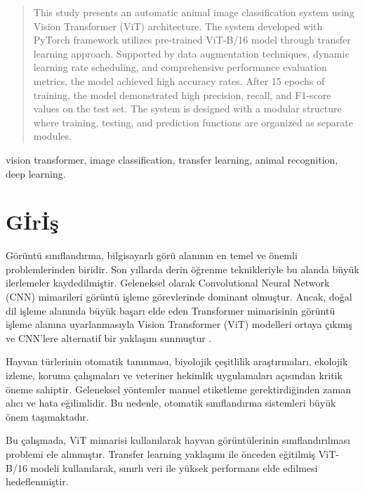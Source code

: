 \documentclass[conference, a4paper]{IEEEtran}
\begin{document}
	\begin{abstract}
		This study presents an automatic animal image classification system using Vision Transformer (ViT) architecture. The system developed with PyTorch framework utilizes pre-trained ViT-B/16 model through transfer learning approach. Supported by data augmentation techniques, dynamic learning rate scheduling, and comprehensive performance evaluation metrics, the model achieved high accuracy rates. After 15 epochs of training, the model demonstrated high precision, recall, and F1-score values on the test set. The system is designed with a modular structure where training, testing, and prediction functions are organized as separate modules.
	\end{abstract}
	\begin{IEEEkeywords}
		vision transformer, image classification, transfer learning, animal recognition, deep learning.
	\end{IEEEkeywords}
	
	\IEEEpeerreviewmaketitle
	
	\IEEEpubidadjcol
	
	
	\section{G{\footnotesize İ}r{\footnotesize İ}ş}
	
	Görüntü sınıflandırma, bilgisayarlı görü alanının en temel ve önemli problemlerinden biridir. Son yıllarda derin öğrenme teknikleriyle bu alanda büyük ilerlemeler kaydedilmiştir. Geleneksel olarak Convolutional Neural Network ({CNN}) mimarileri görüntü işleme görevlerinde dominant olmuştur. Ancak, doğal dil işleme alanında büyük başarı elde eden Transformer mimarisinin görüntü işleme alanına uyarlanmasıyla Vision Transformer ({ViT}) modelleri ortaya çıkmış ve CNN'lere alternatif bir yaklaşım sunmuştur .
	
	Hayvan türlerinin otomatik tanınması, biyolojik çeşitlilik araştırmaları, ekolojik izleme, koruma çalışmaları ve veteriner hekimlik uygulamaları açısından kritik öneme sahiptir. Geleneksel yöntemler manuel etiketleme gerektirdiğinden zaman alıcı ve hata eğilimlidir. Bu nedenle, otomatik sınıflandırma sistemleri büyük önem taşımaktadır.
	
	Bu çalışmada, {ViT} mimarisi kullanılarak hayvan görüntülerinin sınıflandırılması problemi ele alınmıştır. Transfer learning yaklaşımı ile önceden eğitilmiş ViT-B/16 modeli kullanılarak, sınırlı veri ile yüksek performans elde edilmesi hedeflenmiştir.
	
\end{document}
